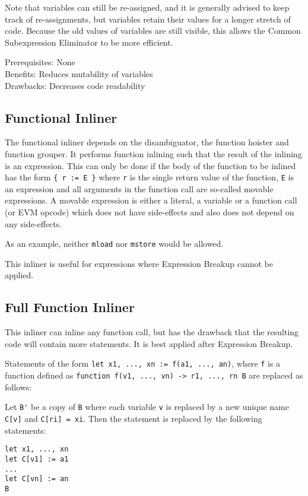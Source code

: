 \documentclass[11pt,letterpaper]{article}
\begin{document}
Note that variables can still be re-assigned, and it is generally
advised to keep track of re-assignments, but variables retain
their values for a longer stretch of code. Because the old
values of variables are still visible, this allows the
Common Subexpression Eliminator to be more efficient.

Prerequisites: None\\
Benefits: Reduces mutability of variables\\
Drawbacks: Decreases code readability

\subsection{Functional Inliner}

The functional inliner depends on the disambiguator, the function hoister and function grouper.
It performs function inlining such that the result of the inlining is an expression. This can
only be done if the body of the function to be inlined has the form \verb|{ r := E }| where
\verb|r|
is the single return value of the function, \verb|E| is an expression and all arguments in the
function call are so-called movable expressions. A movable expression is either a literal, a
variable or a function call (or EVM opcode) which does not have side-effects and also does not
depend on any side-effects.

As an example, neither \verb|mload| nor \verb|mstore| would be allowed.

This inliner is useful for expressions where Expression Breakup cannot be applied.

\subsection{Full Function Inliner}

This inliner can inline any function call, but has the drawback that the resulting
code will contain more statements. It is best applied after Expression Breakup.

Statements of the form \verb|let x1, ..., xn := f(a1, ..., an)|, where \verb|f|
is a function defined as \verb|function f(v1, ..., vn) -> r1, ..., rn B|
are replaced as follows:

Let \verb|B'| be a copy of \verb|B| where each variable \verb|v| is replaced by
a new unique name \verb|C[v]| and \verb|C[ri] = xi|.
Then the statement is replaced by the following statements:
\begin{verbatim}
let x1, ..., xn
let C[v1] := a1
...
let C[vn] := an
B
\end{verbatim}
\end{document}
